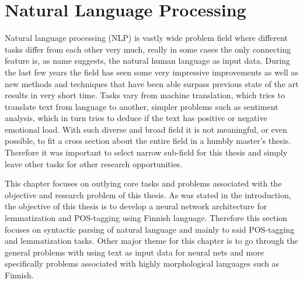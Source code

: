 \documentclass[12pt,a4paper,english
]{tutthesis}
\begin{document}
\chapter{Natural Language Processing}
\label{ch:natural_language_processing}
Natural language processing (NLP) is vastly wide problem field where different tasks differ from each other very much, really in some cases the only connecting feature is, as name suggests, the natural human language as input data. During the last few years the field has seen some very impressive improvements as well as new methods and techniques that have been able surpass previous state of the art results in very short time. Tasks vary from machine translation, which tries to translate text from language to another, simpler problems such as sentiment analysis, which in turn tries to deduce if the text has positive or negative emotional load. With such diverse and broad field it is not meaningful, or even possible, to fit a cross section about the entire field in a humbly master's thesis. Therefore it was important to select narrow sub-field for this thesis and simply leave other tasks for other research opportunities.

This chapter focuses on outlying core tasks and problems associated with the objective and research problem of this thesis. As was stated in the introduction, the objective of this thesis is to develop a neural network architecture for lemmatization and POS-tagging using Finnish language. Therefore this section focuses on syntactic parsing of natural language and mainly to said POS-tagging and lemmatization tasks. Other major theme for this chapter is to go through the general problems with using text as input data for neural nets and more specifically problems associated with highly morphological languages such as Finnish.
\end{document}
